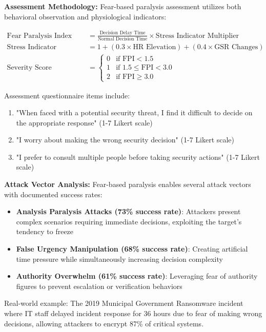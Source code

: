 \documentclass[11pt,a4paper]{article}
\begin{document}
\textbf{Assessment Methodology:}
Fear-based paralysis assessment utilizes both behavioral observation and physiological indicators:

\begin{align}
\text{Fear Paralysis Index} &= \frac{\text{Decision Delay Time}}{\text{Normal Decision Time}} \times \text{Stress Indicator Multiplier} \\
\text{Stress Indicator Multiplier} &= 1 + (0.3 \times \text{HR Elevation}) + (0.4 \times \text{GSR Changes}) \\
\text{Severity Score} &= \begin{cases}
0 & \text{if FPI} < 1.5 \\
1 & \text{if } 1.5 \leq \text{FPI} < 3.0 \\
2 & \text{if FPI} \geq 3.0
\end{cases}
\end{align}

Assessment questionnaire items include:
\begin{enumerate}
\item "When faced with a potential security threat, I find it difficult to decide on the appropriate response" (1-7 Likert scale)
\item "I worry about making the wrong security decision" (1-7 Likert scale)
\item "I prefer to consult multiple people before taking security actions" (1-7 Likert scale)
\end{enumerate}

\textbf{Attack Vector Analysis:}
Fear-based paralysis enables several attack vectors with documented success rates:
\begin{itemize}
\item \textbf{Analysis Paralysis Attacks (73\% success rate)}: Attackers present complex scenarios requiring immediate decisions, exploiting the target's tendency to freeze
\item \textbf{False Urgency Manipulation (68\% success rate)}: Creating artificial time pressure while simultaneously increasing decision complexity
\item \textbf{Authority Overwhelm (61\% success rate)}: Leveraging fear of authority figures to prevent escalation or verification behaviors
\end{itemize}

Real-world example: The 2019 Municipal Government Ransomware incident where IT staff delayed incident response for 36 hours due to fear of making wrong decisions, allowing attackers to encrypt 87\% of critical systems.
\end{document}
